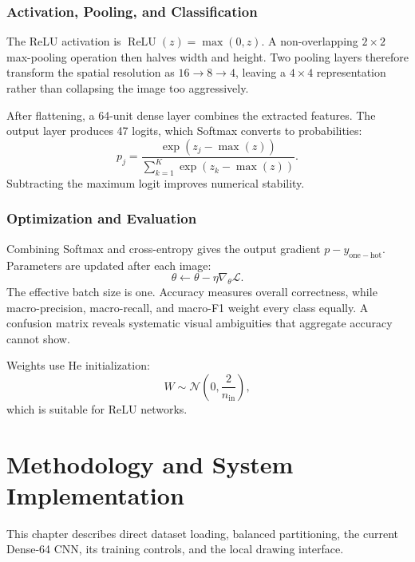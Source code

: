 \documentclass[a4paper,12pt]{extreport}
\begin{document}
\subsection*{Activation, Pooling, and Classification}
The ReLU activation is $\operatorname{ReLU}(z)=\max(0,z)$. A non-overlapping $2\times2$ max-pooling operation then halves width and height. Two pooling layers therefore transform the spatial resolution as $16\rightarrow8\rightarrow4$, leaving a $4\times4$ representation rather than collapsing the image too aggressively.

After flattening, a 64-unit dense layer combines the extracted features. The output layer produces 47 logits, which Softmax converts to probabilities:
\begin{equation}
p_j=\frac{\exp(z_j-\max(z))}{\sum_{k=1}^{K}\exp(z_k-\max(z))}.
\end{equation}
Subtracting the maximum logit improves numerical stability.

\subsection*{Optimization and Evaluation}
Combining Softmax and cross-entropy gives the output gradient $p-y_{\mathrm{one-hot}}$. Parameters are updated after each image:
\begin{equation}
\theta\leftarrow\theta-\eta\nabla_{\theta}\mathcal{L}.
\end{equation}
The effective batch size is one. Accuracy measures overall correctness, while macro-precision, macro-recall, and macro-F1 weight every class equally. A confusion matrix reveals systematic visual ambiguities that aggregate accuracy cannot show.

Weights use He initialization:
\begin{equation}
W\sim\mathcal{N}\left(0,\frac{2}{n_{\mathrm{in}}}\right),
\end{equation}
which is suitable for ReLU networks.

\chapter{Methodology and System Implementation}
\label{sec:methodology}

This chapter describes direct dataset loading, balanced partitioning, the current Dense-64 CNN, its training controls, and the local drawing interface.
\end{document}
